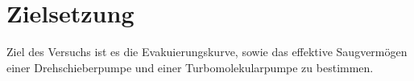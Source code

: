 
\section{Zielsetzung}
\label{sec:Zielsetzung}

Ziel des Versuchs ist es die Evakuierungskurve, sowie das effektive Saugvermögen einer Drehschieberpumpe und einer Turbomolekularpumpe zu bestimmen.